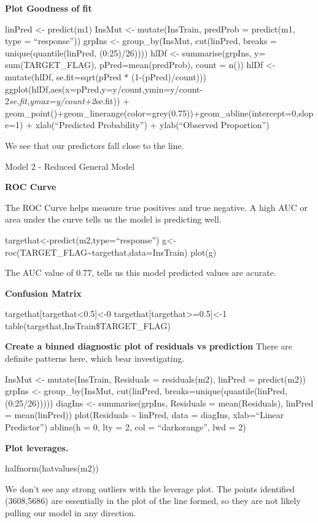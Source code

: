 \documentclass[]{article}
\begin{document}
\textbf{Plot Goodness of fit}

linPred \textless- predict(m1) InsMut \textless- mutate(InsTrain,
predProb = predict(m1, type = ``response'')) grpIns \textless-
group\_by(InsMut, cut(linPred, breaks = unique(quantile(linPred,
(0:25)/26)))) hlDf \textless- summarise(grpIns, y= sum(TARGET\_FLAG),
pPred=mean(predProb), count = n()) hlDf \textless- mutate(hlDf,
se.fit=sqrt(pPred * (1-(pPred)/count)))
ggplot(hlDf,aes(x=pPred,y=y/count,ymin=y/count-2\emph{se.fit,ymax=y/count+2}se.fit))
+
geom\_point()+geom\_linerange(color=grey(0.75))+geom\_abline(intercept=0,slope=1)
+ xlab(``Predicted Probability'') + ylab(``Observed Proportion'')

We see that our predictors fall close to the line.

Model 2 - Reduced General Model

\textbf{ROC Curve}

The ROC Curve helps measure true positives and true negative. A high AUC
or area under the curve tells us the model is predicting well.

targethat\textless-predict(m2,type=``response'')
g\textless-roc(TARGET\_FLAG\textasciitilde targethat,data=InsTrain)
plot(g)

The AUC value of 0.77, tells us this model predicted values are acurate.

\textbf{Confusion Matrix}

targethat{[}targethat\textless0.5{]}\textless-0
targethat{[}targethat\textgreater=0.5{]}\textless-1
table(targethat,InsTrain\$TARGET\_FLAG)

\textbf{Create a binned diagnostic plot of residuals vs prediction}
There are definite patterns here, which bear investigating.

InsMut \textless- mutate(InsTrain, Residuals = residuals(m2), linPred =
predict(m2)) grpIns \textless- group\_by(InsMut, cut(linPred,
breaks=unique(quantile(linPred, (0:25/26))))) diagIns \textless-
summarise(grpIns, Residuals = mean(Residuals), linPred = mean(linPred))
plot(Residuals \textasciitilde{} linPred, data = diagIns, xlab=``Linear
Predictor'') abline(h = 0, lty = 2, col = ``darkorange'', lwd = 2)

\textbf{Plot leverages.}

halfnorm(hatvalues(m2))

We don't see any strong outliers with the leverage plot. The points
identified (3608,5686) are essentially in the plot of the line formed,
so they are not likely pulling our model in any direction.
\end{document}

